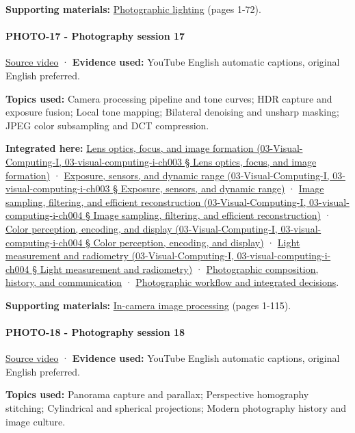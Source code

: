 \textbf{Supporting materials:} \href{https://drive.google.com/open?id=0B6w2XfPHEcZYN1dYTWZndkZDNVE}{Photographic lighting} (pages 1-72).

\paragraph{PHOTO-17 - Photography session 17}\label{photo-17---photography-session-17}

\href{https://www.youtube.com/watch?v=Jb4ojXL3xcA}{Source video} · \textbf{Evidence used:} YouTube English automatic captions, original English preferred.

\textbf{Topics used:} Camera processing pipeline and tone curves; HDR capture and exposure fusion; Local tone mapping; Bilateral denoising and unsharp masking; JPEG color subsampling and DCT compression.

\textbf{Integrated here:} \href{}{Lens optics, focus, and image formation (03-Visual-Computing-I, 03-visual-computing-i-ch003 § Lens optics, focus, and image formation)} · \href{}{Exposure, sensors, and dynamic range (03-Visual-Computing-I, 03-visual-computing-i-ch003 § Exposure, sensors, and dynamic range)} · \href{}{Image sampling, filtering, and efficient reconstruction (03-Visual-Computing-I, 03-visual-computing-i-ch004 § Image sampling, filtering, and efficient reconstruction)} · \href{}{Color perception, encoding, and display (03-Visual-Computing-I, 03-visual-computing-i-ch004 § Color perception, encoding, and display)} · \href{}{Light measurement and radiometry (03-Visual-Computing-I, 03-visual-computing-i-ch004 § Light measurement and radiometry)} · \hyperref[04-visual-computing-ii-ch034]{Photographic composition, history, and communication} · \hyperref[04-visual-computing-ii-ch034]{Photographic workflow and integrated decisions}.

\textbf{Supporting materials:} \href{https://drive.google.com/open?id=0B6w2XfPHEcZYeTFKZWhndVBOYTA}{In-camera image processing} (pages 1-115).

\paragraph{PHOTO-18 - Photography session 18}\label{photo-18---photography-session-18}

\href{https://www.youtube.com/watch?v=fE0GQ9Tvn4U}{Source video} · \textbf{Evidence used:} YouTube English automatic captions, original English preferred.

\textbf{Topics used:} Panorama capture and parallax; Perspective homography stitching; Cylindrical and spherical projections; Modern photography history and image culture.

